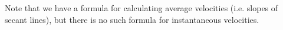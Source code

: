 {Note that we have a formula for calculating average velocities (i.e. slopes of secant lines), but there is no such formula for instantaneous velocities.}
{}